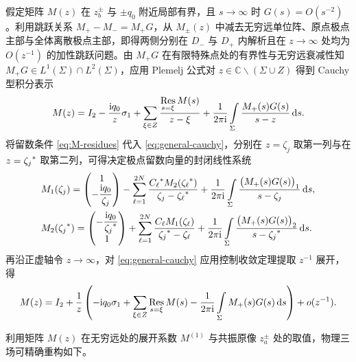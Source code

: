 假定矩阵 $M(z)$ 在 $z_b^\pm$ 与 $\pm q_0$ 附近局部有界，且 $s\to\infty$ 时 $G(s)=O(s^{-2})$。利用跳跃关系 $M_+-M_-=M_+G$，从 $M_\pm(z)$ 中减去无穷远单位阵、原点极点主部与全体离散极点主部，即得两侧分别在 $D_-$ 与 $D_+$ 内解析且在 $z\to\infty$ 处均为 $O(z^{-1})$ 的加性跳跃问题。由 $M_+G$ 在有限特殊点处的有界性与无穷远衰减性知 $M_+G\in L^1(\Sigma)\cap L^2(\Sigma)$，应用 Plemelj 公式\cite{ZhangFan2020,Fan2022}对 $z\in\mathbb C\mathbin{\backslash}(\Sigma\cup Z)$ 得到 Cauchy 型积分表示
\begin{equation}\label{eq:general-cauchy}
M(z)=I_2-\dfrac{\mathrm{i} q_0}{z}\sigma_1
+\sum\limits_{\xi\in Z}\dfrac{\operatorname*{Res}\limits_{s=\xi}M(s)}{z-\xi}
+\dfrac{1}{2\pi\mathrm{i}}\int\limits_\Sigma\dfrac{M_+(s)G(s)}{s-z}\,\mathrm{d} s.
\end{equation}
将留数条件 \eqref{eq:M-residues} 代入 \eqref{eq:general-cauchy}，分别在 $z=\zeta_j$ 取第一列与在 $z={\zeta_j}^{*}$ 取第二列，可得决定极点留数向量的封闭线性系统
\begin{align}
&M_1(\zeta_j)=\begin{pmatrix}1\\-\dfrac{\mathrm{i} q_0}{\zeta_j}\end{pmatrix}
-\sum\limits_{\ell=1}^{2N}\dfrac{{C_\ell}^{*}M_2({\zeta_\ell}^{*})}{\zeta_j-{\zeta_\ell}^{*}}
+\dfrac{1}{2\pi\mathrm{i}}\int\limits_\Sigma\dfrac{\bigl(M_+(s)G(s)\bigr)_1}{s-\zeta_j}\,\mathrm{d} s,
\label{eq:general-finite1}\\
&M_2({\zeta_j}^{*})=\begin{pmatrix}-\dfrac{\mathrm{i} q_0}{{\zeta_j}^{*}}\\1\end{pmatrix}
+\sum\limits_{\ell=1}^{2N}\dfrac{C_\ell M_1(\zeta_\ell)}{{\zeta_j}^{*}-\zeta_\ell}
+\dfrac{1}{2\pi\mathrm{i}}\int\limits_\Sigma\dfrac{\bigl(M_+(s)G(s)\bigr)_2}{s-{\zeta_j}^{*}}\,\mathrm{d} s.
\label{eq:general-finite2}
\end{align}
再沿正虚轴令 $z\to\infty$，对 \eqref{eq:general-cauchy} 应用控制收敛定理提取 $z^{-1}$ 展开，得
\begin{equation}\label{eq:M1-general}
M(z)=I_2+\dfrac{1}{z}\left(-\mathrm{i} q_0\sigma_1
+\sum\limits_{\xi\in Z}\operatorname*{Res}\limits_{s=\xi}M(s)
-\dfrac{1}{2\pi\mathrm{i}}\int\limits_\Sigma M_+(s)G(s)\,\mathrm{d} s\right)+o(z^{-1}).
\end{equation}

利用矩阵 $M(z)$ 在无穷远处的展开系数 $M^{(1)}$ 与共振原像 $z_a^\pm$ 处的取值，物理三场可精确重构如下。

